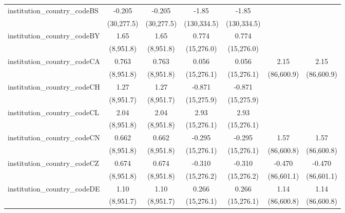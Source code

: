 \begin{tabular}{lcccccc}
   institution\_country\_codeBS          & -0.205        & -0.205        & -1.85         & -1.85         &              &   \\   
                                         & (30,277.5)    & (30,277.5)    & (130,334.5)   & (130,334.5)   &              &   \\   
   institution\_country\_codeBY          & 1.65          & 1.65          & 0.774         & 0.774         &              &   \\   
                                         & (8,951.8)     & (8,951.8)     & (15,276.0)    & (15,276.0)    &              &   \\   
   institution\_country\_codeCA          & 0.763         & 0.763         & 0.056         & 0.056         & 2.15         & 2.15\\   
                                         & (8,951.8)     & (8,951.8)     & (15,276.1)    & (15,276.1)    & (86,600.9)   & (86,600.9)\\   
   institution\_country\_codeCH          & 1.27          & 1.27          & -0.871        & -0.871        &              &   \\   
                                         & (8,951.7)     & (8,951.7)     & (15,275.9)    & (15,275.9)    &              &   \\   
   institution\_country\_codeCL          & 2.04          & 2.04          & 2.93          & 2.93          &              &   \\   
                                         & (8,951.8)     & (8,951.8)     & (15,276.1)    & (15,276.1)    &              &   \\   
   institution\_country\_codeCN          & 0.662         & 0.662         & -0.295        & -0.295        & 1.57         & 1.57\\   
                                         & (8,951.8)     & (8,951.8)     & (15,276.1)    & (15,276.1)    & (86,600.8)   & (86,600.8)\\   
   institution\_country\_codeCZ          & 0.674         & 0.674         & -0.310        & -0.310        & -0.470       & -0.470\\   
                                         & (8,951.8)     & (8,951.8)     & (15,276.2)    & (15,276.2)    & (86,601.1)   & (86,601.1)\\   
   institution\_country\_codeDE          & 1.10          & 1.10          & 0.266         & 0.266         & 1.14         & 1.14\\   
                                         & (8,951.7)     & (8,951.7)     & (15,276.1)    & (15,276.1)    & (86,600.8)   & (86,600.8)\\   

\end{tabular}
